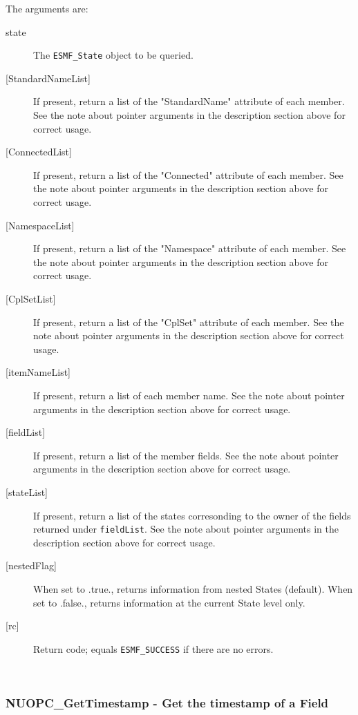      The arguments are:
     \begin{description}
     \item[state]
       The {\tt ESMF\_State} object to be queried.
     \item[{[StandardNameList]}]
       If present, return a list of the "StandardName" attribute of each member.
       See the note about pointer arguments in the description section above for
       correct usage.
     \item[{[ConnectedList]}]
       If present, return a list of the "Connected" attribute of each member.
       See the note about pointer arguments in the description section above for
       correct usage.
     \item[{[NamespaceList]}]
       If present, return a list of the "Namespace" attribute of each member.
       See the note about pointer arguments in the description section above for
       correct usage.
     \item[{[CplSetList]}]
       If present, return a list of the "CplSet" attribute of each member.
       See the note about pointer arguments in the description section above for
       correct usage.
     \item[{[itemNameList]}]
       If present, return a list of each member name.
       See the note about pointer arguments in the description section above for
       correct usage.
     \item[{[fieldList]}]
       If present, return a list of the member fields.
       See the note about pointer arguments in the description section above for
       correct usage.
     \item[{[stateList]}]
       If present, return a list of the states corresonding to the owner of the
       fields returned under {\tt fieldList}.
       See the note about pointer arguments in the description section above for
       correct usage.
     \item[{[nestedFlag]}]
       When set to .true., returns information from nested States (default).
       When set to .false., returns information at the current State level only.
     \item[{[rc]}]
       Return code; equals {\tt ESMF\_SUCCESS} if there are no errors.
     \end{description}
   
 
\mbox{}\hrulefill\ 
 
\subsubsection [NUOPC\_GetTimestamp] {NUOPC\_GetTimestamp - Get the timestamp of a Field}


